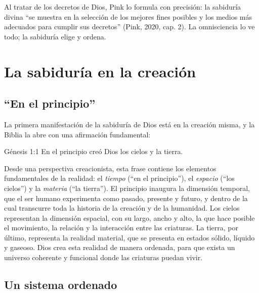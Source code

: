 Al tratar de los decretos de Dios, Pink lo formula con precisión: la sabiduría divina ``se muestra en la selección de los mejores fines posibles y los medios más adecuados para cumplir sus decretos'' (Pink, 2020, cap. 2). La omnisciencia lo ve todo; la sabiduría elige y ordena.

\section{La sabiduría en la creación}

\subsection{“En el principio”}

La primera manifestación de la sabiduría de Dios está en la creación misma, y la Biblia la abre con una afirmación fundamental:

\begin{verso}{Génesis 1:1}
En el principio creó Dios los cielos y la tierra.
\end{verso}

Desde una perspectiva creacionista, esta frase contiene los elementos fundamentales de la realidad: el \emph{tiempo} (``en el principio''), el \emph{espacio} (``los cielos'') y la \emph{materia} (``la tierra''). El principio inaugura la dimensión temporal, que el ser humano experimenta como pasado, presente y futuro, y dentro de la cual transcurre toda la historia de la creación y de la humanidad. Los cielos representan la dimensión espacial, con su largo, ancho y alto, la que hace posible el movimiento, la relación y la interacción entre las criaturas. La tierra, por último, representa la realidad material, que se presenta en estados sólido, líquido y gaseoso. Dios crea esta realidad de manera ordenada, para que exista un universo coherente y funcional donde las criaturas puedan vivir.


\subsection{Un sistema ordenado}

